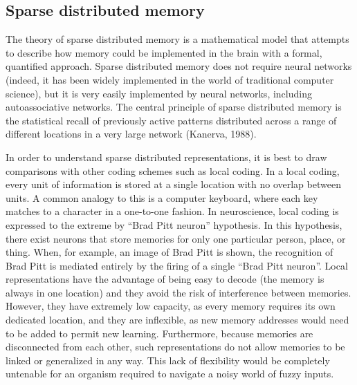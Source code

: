 \documentclass[12pt,a4paperpaper,]{report}
\begin{document}
\subsection{Sparse distributed memory}\label{sparse-distributed-memory}

The theory of sparse distributed memory is a mathematical model that
attempts to describe how memory could be implemented in the brain with a
formal, quantified approach. Sparse distributed memory does not require
neural networks (indeed, it has been widely implemented in the world of
traditional computer science), but it is very easily implemented by
neural networks, including autoassociative networks. The central
principle of sparse distributed memory is the statistical recall of
previously active patterns distributed across a range of different
locations in a very large network (Kanerva, 1988).

In order to understand sparse distributed representations, it is best to
draw comparisons with other coding schemes such as local coding. In a
local coding, every unit of information is stored at a single location
with no overlap between units. A common analogy to this is a computer
keyboard, where each key matches to a character in a one-to-one fashion.
In neuroscience, local coding is expressed to the extreme by ``Brad Pitt
neuron'' hypothesis. In this hypothesis, there exist neurons that store
memories for only one particular person, place, or thing. When, for
example, an image of Brad Pitt is shown, the recognition of Brad Pitt is
mediated entirely by the firing of a single ``Brad Pitt neuron''. Local
representations have the advantage of being easy to decode (the memory
is always in one location) and they avoid the risk of interference
between memories. However, they have extremely low capacity, as every
memory requires its own dedicated location, and they are inflexible, as
new memory addresses would need to be added to permit new learning.
Furthermore, because memories are disconnected from each other, such
representations do not allow memories to be linked or generalized in any
way. This lack of flexibility would be completely untenable for an
organism required to navigate a noisy world of fuzzy inputs.
\end{document}
